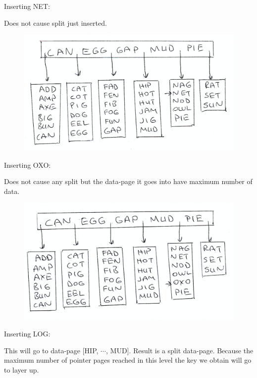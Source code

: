 \documentclass[12pt]{article}
\begin{document}
\begin{enumerate}
    Inserting NET:

    Does not cause split just inserted.

    \begin{figure}[H] \label{fig:insertnet}
        \centering
        \includegraphics[width=\textwidth]{img/insertnet.png}
    \end{figure}

    Inserting OXO:

    Does not cause any split but the data-page it goes into have maximum number of data.

    \begin{figure}[H] \label{fig:insertoxo}
        \centering
        \includegraphics[width=\textwidth]{img/insertoxo.png}
    \end{figure}

    Inserting LOG:

    This will go to data-page [HIP, $\cdots$, MUD]. Result is a split data-page. Because the maximum number of pointer pages reached in this level the key we obtain will go to layer up.


\end{enumerate}
\end{document}
